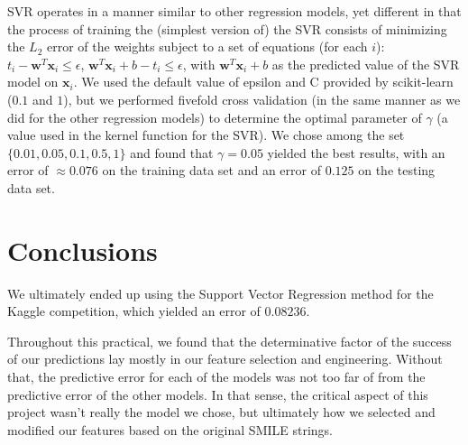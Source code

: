 \documentclass[11pt]{article}
\begin{document}
SVR operates in a manner similar to other regression models, yet different in that the process of training the (simplest version of) the SVR consists of minimizing the $L_2$ error of the weights subject to a set of equations (for each $i$): $t_i - \textbf{w}^T\textbf{x}_i \leq \epsilon$, $\textbf{w}^T\textbf{x}_i + b - t_i \leq \epsilon$, with $\textbf{w}^T\textbf{x}_i + b$ as the predicted value of the SVR model on $\textbf{x}_i$. We used the default value of epsilon and C provided by scikit-learn ($0.1$ and $1$), but we performed fivefold cross validation (in the same manner as we did for the other regression models) to determine the optimal parameter of $\gamma$ (a value used in the kernel function for the SVR). We chose among the set $\{0.01, 0.05, 0.1, 0.5, 1\}$ and found that $\gamma = 0.05$ yielded the best results, with an error of $\approx 0.076$ on the training data set and an error of $0.125$ on the testing data set.

\section{Conclusions}

We ultimately ended up using the Support Vector Regression method for the Kaggle competition, which yielded an error of $0.08236$.

Throughout this practical, we found that the determinative factor of the success of our predictions lay mostly in our feature selection and engineering. Without that, the predictive error for each of the models was not too far of from the predictive error of the other models. In that sense, the critical aspect of this project wasn't really the model we chose, but ultimately how we selected and modified our features based on the original SMILE strings.
\end{document}
